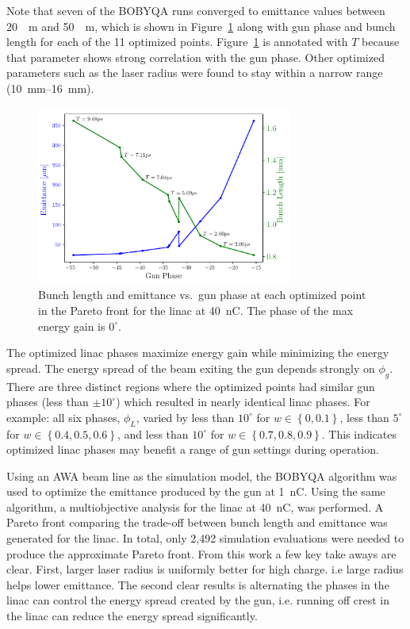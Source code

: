 Note that seven of the BOBYQA runs converged to emittance values
between \SI{20}{\mu m} and \SI{50}{\mu m}, which is shown in Figure~\ref{fig:trade} 
along with gun phase and bunch length for each of the 11
optimized points. Figure~\ref{fig:trade} is annotated with $T$ because that parameter 
shows strong correlation with the gun phase. Other optimized parameters such as the laser radius were found to stay within a 
narrow range (\SIrange{10}{16}{mm}).  
\begin{figure}%
	\begin{center}
		\includegraphics[width=0.75\textwidth]{images/THPAB155f3}
		\caption{\label{fig:trade}Bunch length and emittance vs.~gun phase at each optimized point in the Pareto front for the linac at \SI{40}{nC}. The phase of the max energy gain is $0^{\circ}$.}
	\end{center}
\end{figure}


The optimized linac phases maximize energy gain while minimizing the energy spread.
The energy spread of the beam exiting the gun depends strongly on $\phi_g$.
There are three distinct regions where the optimized points had similar gun phases 
(less than $\pm10^{\circ}$) which resulted in nearly identical linac phases. For example:  
all six phases, $\phi_L$, varied by less than $10^{\circ}$ for $w \in \left\{ 0, 0.1\right\}$,
less than $5^{\circ}$ for $w \in \left\{ 0.4, 0.5, 0.6\right\}$, 
and less than $10^{\circ}$ for $w \in \left\{ 0.7, 0.8, 0.9\right\}$.
This indicates optimized linac phases may benefit a range of gun settings during operation. 


Using an AWA beam line as the simulation model, the BOBYQA algorithm was used 
to optimize the emittance produced by the gun at \SI{1}{nC}.
Using the same algorithm, a multiobjective analysis for the linac at \SI{40}{nC}, was performed. 
A Pareto front comparing the trade-off between bunch length and emittance was generated for the linac. 
In total, only 2,492 simulation evaluations were needed to produce the approximate Pareto front.
From this work a few key take aways are clear. First, larger laser radius
is uniformly better for high charge. i.e large radius helps lower emittance.
The second clear results is alternating the phases in the linac can control 
the energy spread created by the gun, i.e. running off crest in the linac 
can reduce the energy spread significantly.

